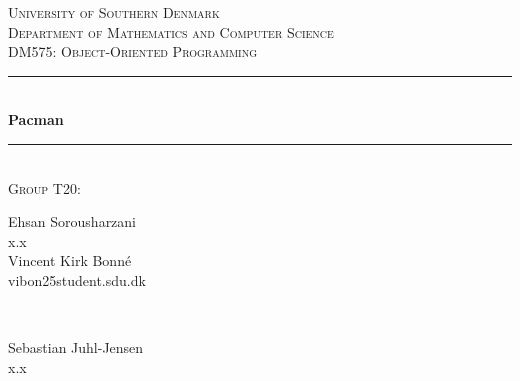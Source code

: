 \documentclass[a4paper,12pt]{article}
\begin{document}
\begin{titlepage}

\newcommand{\HRule}{\rule{\linewidth}{0.5mm}}

\center %


	\textsc{\LARGE University of Southern Denmark}\\[1.5cm]

	\textsc{\Large Department of Mathematics and Computer Science}\\[0.5cm]

	\textsc{\large DM575: Object-Oriented Programming}\\[0.5cm]


	\HRule\\[0.7cm]

	{\huge\bfseries Pacman}\\[0.4cm] %

	\HRule\\[1.0cm]

	\large
	\textsc{Group T20:}\\ \bigskip
	\begin{minipage}[t]{0.45\textwidth}
	    \begin{center}
		    \normalsize
		    Ehsan Sorousharzani\\
		    x\@x.x\\ \bigskip
		    Vincent Kirk Bonné\\
		    vibon25\@x student.sdu.dk\\ \bigskip

	   \end{center}
	\end{minipage}
	~
	\begin{minipage}[t]{0.45\textwidth}
	    \begin{center}
		    \normalsize
		    Sebastian Juhl-Jensen\\
		    x\@x.x\\ \bigskip
		\end{center}
	\end{minipage}
	


\end{titlepage}
\end{document}
